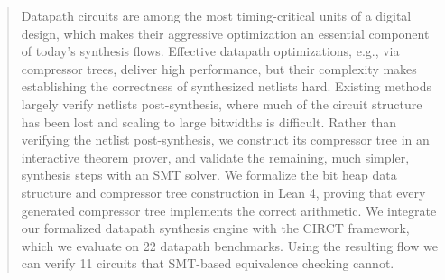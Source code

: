 \documentclass[conference]{IEEEtran}
\theoremstyle{plain}
\theoremstyle{definition}
\newcommand{\SynthesisSpeedupGeomean}{\ensuremath{X \times}}
\begin{document}
\begin{abstract}
Datapath circuits are among the most timing-critical units of a digital design,
which makes their aggressive optimization an essential component of today's
synthesis flows.
Effective datapath optimizations, e.g., via compressor trees, deliver high performance, but their
complexity makes establishing the correctness of synthesized netlists hard.
Existing methods largely verify netlists post-synthesis, where much of the circuit
structure has been lost and scaling to large bitwidths is difficult.
Rather than verifying the netlist post-synthesis, 
we construct its compressor tree in an interactive theorem prover, 
and validate the remaining, much simpler, synthesis steps with an SMT solver.
We formalize the bit heap data structure and compressor tree construction in Lean 4,
proving that every generated compressor tree implements the correct arithmetic.
We integrate our formalized datapath synthesis engine with the CIRCT framework, which 
we evaluate on 22 datapath benchmarks.
Using the resulting flow we can verify 11 circuits that SMT-based equivalence checking cannot. 

\end{abstract}
\end{document}
